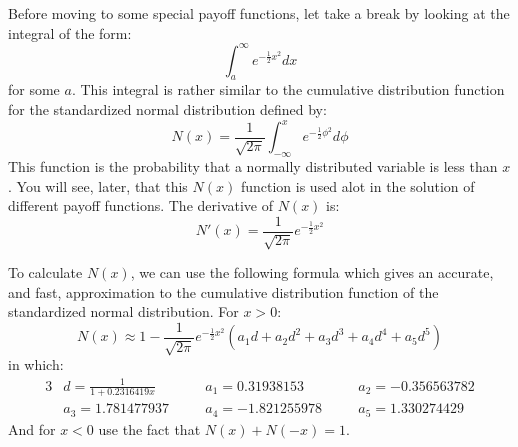 Before moving to some special payoff functions, let take a break by looking at the integral of the form:
\begin{equation}
    \int_a^\infty e^{-\frac{1}{2}x^2} dx
    \label{equ:cdf_bsm_01}
\end{equation}
for some $a$. This integral is rather similar to the cumulative distribution function for the standardized normal distribution defined by:
\begin{equation}
    N(x) = \frac{1}{\sqrt{2\pi}}\int_{-\infty}^x e^{-\frac{1}{2}\phi^2} d\phi
    \label{equ:cdf_bsm_02}
\end{equation}
This function is the probability that a normally distributed variable is less than $x$. You will see, later, that this $N(x)$ function is used alot in the solution of different payoff functions. The derivative of $N(x)$ is:
\begin{equation}
    N'(x) = \frac{1}{\sqrt{2\pi}} e^{-\frac{1}{2}x^2}
\end{equation}

To calculate $N(x)$, we can use the following formula which gives an accurate, and fast, approximation to the cumulative distribution function of the standardized normal distribution. For $x > 0$:
\begin{equation}
	N(x) \approx 1 - \frac{1}{\sqrt{2\pi}} e^{-\frac{1}{2}x^2} \left( a_1 d + a_2 d^2 + a_3 d^3 + a_4 d^4 + a_5 d^5 \right)
\end{equation}
in which:
\begin{alignat*}{3}
    & d   = \frac{1}{1 + 0.2316419x}  \quad && a_1  = 0.31938153   \quad && a_2 = -0.356563782 \\
    & a_3 = 1.781477937               \quad && a_4  = -1.821255978 \quad && a_5 = 1.330274429
\end{alignat*}
And for $x < 0$ use the fact that $N(x) + N(-x) = 1$.


